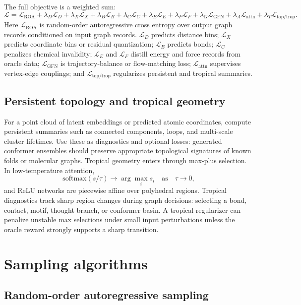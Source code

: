 \documentclass[11pt]{article}
\newcommand{\1}{\mathbf{1}}
\begin{document}
The full objective is a weighted sum:
\[
\mathcal L=\mathcal L_{\mathrm{ROA}}+
\lambda_D\mathcal L_D+
\lambda_X\mathcal L_X+
\lambda_B\mathcal L_B+
\lambda_C\mathcal L_C+
\lambda_E\mathcal L_E+
\lambda_F\mathcal L_F+
\lambda_G\mathcal L_{\mathrm{GFN}}+
\lambda_A\mathcal L_{\mathrm{attn}}+
\lambda_T\mathcal L_{\mathrm{top/trop}}.
\]
Here $\mathcal L_{\mathrm{ROA}}$ is random-order autoregressive cross entropy over output graph records conditioned on input graph records. $\mathcal L_D$ predicts distance bins; $\mathcal L_X$ predicts coordinate bins or residual quantization; $\mathcal L_B$ predicts bonds; $\mathcal L_C$ penalizes chemical invalidity; $\mathcal L_E$ and $\mathcal L_F$ distill energy and force records from oracle data; $\mathcal L_{\mathrm{GFN}}$ is trajectory-balance or flow-matching loss; $\mathcal L_{\mathrm{attn}}$ supervises vertex-edge couplings; and $\mathcal L_{\mathrm{top/trop}}$ regularizes persistent and tropical summaries.

\subsection{Persistent topology and tropical geometry}

For a point cloud of latent embeddings or predicted atomic coordinates, compute persistent summaries such as connected components, loops, and multi-scale cluster lifetimes. Use these as diagnostics and optional losses: generated conformer ensembles should preserve appropriate topological signatures of known folds or molecular graphs. Tropical geometry enters through max-plus selection. In low-temperature attention,
\[
\mathrm{softmax}(s/\tau)\rightarrow \arg\max_i s_i\quad\mathrm{as}\quad\tau\rightarrow0,
\]
and ReLU networks are piecewise affine over polyhedral regions. Tropical diagnostics track sharp region changes during graph decisions: selecting a bond, contact, motif, thought branch, or conformer basin. A tropical regularizer can penalize unstable max selections under small input perturbations unless the oracle reward strongly supports a sharp transition.

\section{Sampling algorithms}

\subsection{Random-order autoregressive sampling}
\end{document}
